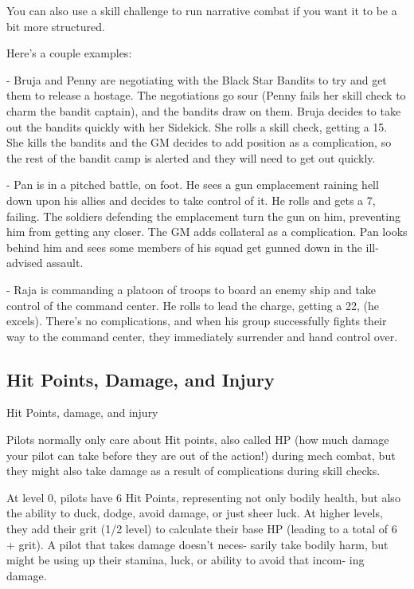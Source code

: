 You can also use a skill challenge to run narrative combat if you want it to be a bit more
structured.


Here’s a couple examples:

	        - Bruja and Penny are negotiating with the Black Star Bandits to try and get them to
release a hostage. The negotiations go sour (Penny fails her skill check to charm the bandit
captain), and the bandits draw on them. Bruja decides to take out the bandits quickly with her
Sidekick. She rolls a skill check, getting a 15. She kills the bandits and the GM decides to add
position as a complication, so the rest of the bandit camp is alerted and they will need to get out
quickly.

	        - Pan is in a pitched battle, on foot. He sees a gun emplacement raining hell down upon
his allies and decides to take control of it. He rolls and gets a 7, failing. The soldiers defending
the emplacement turn the gun on him, preventing him from getting any closer. The GM adds
collateral as a complication. Pan looks behind him and sees some members of his squad get
gunned down in the ill-advised assault.

	        - Raja is commanding a platoon of troops to board an enemy ship and take control of the
command center. He rolls to lead the charge, getting a 22, (he excels). There’s no complications,
and when his group successfully fights their way to the command center, they immediately
surrender and hand control over.


\subsection{Hit Points, Damage, and Injury}

                                 Hit Points, damage, and injury

Pilots normally only care about Hit points, also called HP (how much damage your pilot can take
before they are out of the action!) during mech combat, but they might also take damage as a
result of complications during skill checks.

At level 0, pilots have 6 Hit Points, representing not only bodily health, but also the ability to
duck, dodge, avoid damage, or just sheer luck. At higher levels, they add their grit (1/2 level) to
calculate their base HP (leading to a total of 6 + grit). A pilot that takes damage doesn’t neces-
sarily take bodily harm, but might be using up their stamina, luck, or ability to avoid that incom-
ing damage.

